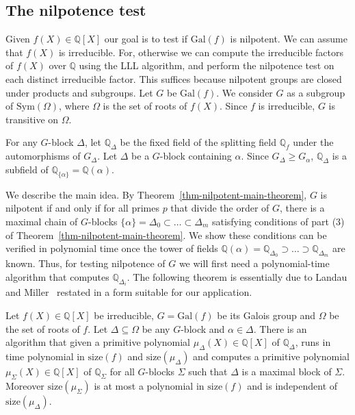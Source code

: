 \documentclass{llncs}
\newcommand{\size}[1]{{\ensuremath{\mathrm{size}\left(#1\right)}}}
\newcommand{\Gal}[1]{{\ensuremath{\mathrm{Gal}\left(#1\right)}}}
\newcommand{\Sym}[1]{{\ensuremath{\mathrm{Sym}\left(#1\right)}}}
\newcommand{\Q}{\ensuremath{\mathbb{Q}}}
\begin{document}
\subsection{\bf The nilpotence test}

Given $f(X) \in \Q[X]$ our goal is to test if $\Gal{f}$ is nilpotent.
We can assume that $f(X)$ is irreducible. For, otherwise we can
compute the irreducible factors of $f(X)$ over $\Q$ using the LLL
algorithm, and perform the nilpotence test on each distinct
irreducible factor. This suffices because nilpotent groups are closed
under products and subgroups. Let $G$ be $\Gal{f}$. We consider $G$ as
a subgroup of $\Sym{\Omega}$, where $\Omega$ is the set of roots of
$f(X)$. Since $f$ is irreducible, $G$ is transitive on $\Omega$.

For any $G$-block $\Delta$, let $\Q_\Delta$ be the fixed field of the
splitting field $\Q_f$ under the automorphisms of $G_\Delta$. Let
$\Delta$ be a $G$-block containing $\alpha$. Since $G_\Delta \geq
G_\alpha$, $\Q_\Delta$ is a subfield of $\Q_{\{\alpha\}} =
\Q(\alpha)$.

We describe the main idea. By
Theorem~\ref{thm-nilpotent-main-theorem}, $G$ is nilpotent if and only
if for all primes $p$ that divide the order of $G$, there is a maximal
chain of $G$-blocks $\{\alpha \} = \Delta_0\subset \ldots \subset
\Delta_m$ satisfying conditions of part (3) of
Theorem~\ref{thm-nilpotent-main-theorem}. We show these conditions can
be verified in polynomial time once the tower of fields $\Q(\alpha) =
\Q_{\Delta_0} \supset \ldots \supset \Q_{\Delta_m}$ are known. Thus,
for testing nilpotence of $G$ we will first need a polynomial-time
algorithm that computes $\Q_{\Delta_i}$. The following theorem is
essentially due to Landau and Miller~\cite{landau85solvability}
restated in a form suitable for our application.



\begin{theorem}\label{thm-enlarge-block}
  Let $f(X)\in\Q[X]$ be irreducible, $G=\Gal{f}$ be its Galois group
  and $\Omega$ be the set of roots of $f$. Let $\Delta\subseteq\Omega$
  be any $G$-block and $\alpha\in \Delta$. There is an algorithm that
  given a primitive polynomial $\mu_\Delta(X) \in \Q[X]$ of
  $\Q_\Delta$, runs in time polynomial in $\size{f}$ and
  $\size{\mu_\Delta}$ and computes a primitive polynomial
  $\mu_\Sigma(X) \in \Q[X]$ of $\Q_\Sigma$ for all $G$-blocks $\Sigma$
  such that $\Delta$ is a maximal block of $\Sigma$.  Moreover
  $\size{\mu_\Sigma}$ is at most a polynomial in $\size{f}$ and is
  independent of $\size{\mu_\Delta}$.
\end{theorem}
\end{document}
